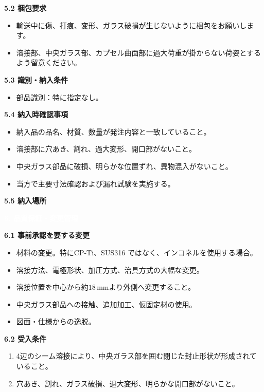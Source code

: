 \documentclass[a4paper,10pt]{ltjsarticle}
\newlength{\SpecBodyWidth}
\newcommand{\PageTitle}[1]{%
  \vspace*{2mm}%
  \noindent\colorbox{SpecHead}{%
    \parbox{\dimexpr\SpecBodyWidth-2\fboxsep\relax}{%
      \large\bfseries\textcolor{white}{#1}%
    }%
  }%
  \par\vspace{5mm}%
}
\newcommand{\BlockTitle}[1]{%
  \vspace{4mm}%
  \noindent\colorbox{SpecSoft}{%
    \parbox{\dimexpr\SpecBodyWidth-2\fboxsep\relax}{%
      \normalsize\bfseries\textcolor{SpecHead}{#1}%
    }%
  }%
  \par\vspace{1.5mm}%
}
\newcommand{\Note}[1]{%
  \vspace{1.5mm}%
  \noindent\fbox{%
    \parbox{\dimexpr\SpecBodyWidth-2\fboxsep-2\fboxrule\relax}{%
      \footnotesize\textcolor{SpecMuted}{#1}%
    }%
  }%
  \par\vspace{1.5mm}%
}
\begin{document}
\BlockTitle{5.2 梱包要求}
\begin{itemize}
\item 輸送中に傷、打痕、変形、ガラス破損が生じないように梱包をお願いします。
  \item 溶接部、中央ガラス部、カプセル曲面部に過大荷重が掛からない荷姿とするよう留意ください。
\end{itemize}

\BlockTitle{5.3 識別・納入条件}
\begin{itemize}
  \item 部品識別：特に指定なし。
\end{itemize}

\BlockTitle{5.4 納入時確認事項}
\begin{itemize}
  \item 納入品の品名、材質、数量が発注内容と一致していること。
  \item 溶接部に穴あき、割れ、過大変形、開口部がないこと。
  \item 中央ガラス部品に破損、明らかな位置ずれ、異物混入がないこと。
  \item 当方で主要寸法確認および漏れ試験を実施する。
\end{itemize}


\BlockTitle{5.5 納入場所}

\Note{ 319-1292 茨城県日立市大みか町7-1-2 エネ棟3F 304 西田 賢人 宛 （お手数ですが着払いにて返送いただけますと幸いです。） }


\clearpage

\PageTitle{6. 品質保証・変更管理}

\BlockTitle{6.1 事前承認を要する変更}
\begin{itemize}
  \item 材料の変更。特にCP-Ti、SUS316 ではなく、インコネルを使用する場合。
  \item 溶接方法、電極形状、加圧方式、治具方式の大幅な変更。
  \item 溶接位置を中心から約\(18\,\mathrm{mm}\)より外側へ変更すること。
  \item 中央ガラス部品への接触、追加加工、仮固定材の使用。
  \item 図面・仕様からの逸脱。
\end{itemize}

\BlockTitle{6.2 受入条件}
\begin{enumerate}
  \item 4辺のシーム溶接により、中央ガラス部を囲む閉じた封止形状が形成されていること。
  \item 穴あき、割れ、ガラス破損、過大変形、明らかな開口部がないこと。
\end{enumerate}
\end{document}
